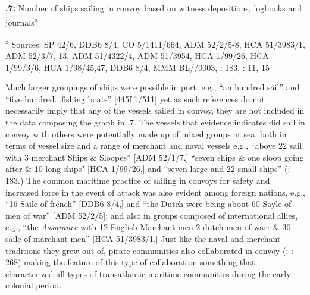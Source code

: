   
 

\textbf{.7:} Number of ships sailing in convoy based on witness depositions, logbooks and journals\textsuperscript{a}

\textsuperscript{a} Sources: SP 42/6, DDB6 8/4, CO 5/1411/664, ADM 52/2/5-8, HCA 51/3983/1, ADM 52/3/7, 13, ADM 51/4322/4, ADM 51/3954, HCA 1/99/26, HCA 1/99/3/6, HCA 1/98/45,47, DDB6 8/4, MMM BL/\citealt{Egerton2395}/0003, \citealt{Bicheno2012}: 183, \citealt{Gage1648}: 11, 15

Much larger groupings of ships were possible in port, e.g., “an hundred sail” and “five hundred...fishing boats” [445f.1/511] yet as such references do not necessarily imply that any of the vessels sailed in convoy, they are not included in the data composing the graph in .7. The vessels that evidence indicates did sail in convoy with others were potentially made up of mixed groups at sea, both in terms of vessel size and a range of merchant and naval vessels e.g., “above 22 sail with 3 merchant Ships \& Sloopes” [ADM 52/1/7,] “seven ships \& one sloop going after \& 10 long ships" [HCA 1/99/26,] and “seven large and 22 small ships” (\citealt{Bicheno2012}: 183.) The common maritime practice of sailing in convoys for safety and increased force in the event of attack was also evident among foreign nations, e.g., “16 Saile of french” [DDB6 8/4,] and “the Dutch were being about 60 Sayle of men of war” [ADM 52/2/5]; and also in groups composed of international allies, e.g., “the \textit{Assurance} with 12 English Marchant men 2 dutch men of warr \& 30 saile of marchant men” [HCA 51/3983/1.] Just like the naval and merchant traditions they grew out of, pirate communities also collaborated in convoy (\citealt{Esquemelin1678}; \citealt{Rediker1987}: 268) making the feature of this type of collaboration something that characterized all types of transatlantic maritime communities during the early colonial period. 

